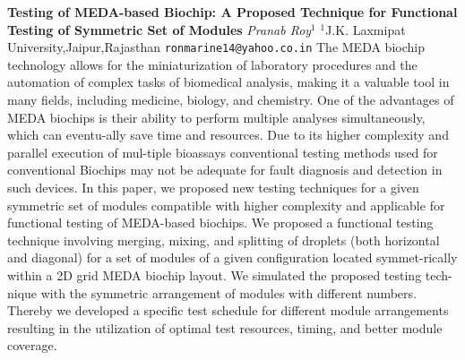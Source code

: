 
    \begin{conf-abstract}[]
        {\textbf{Testing of MEDA-based Biochip: A Proposed Technique for Functional Testing of Symmetric Set of Modules}}
        {\textit{Pranab Roy$^{1}$}}
        {$^{1}$J.K. Laxmipat University,Jaipur,Rajasthan}
        {\texttt{ronmarine14@yahoo.co.in}}
        {The MEDA biochip technology allows for the miniaturization of laboratory procedures and the automation of complex tasks of biomedical analysis, making it a valuable tool in many fields, including medicine, biology, and chemistry. One of the advantages of MEDA biochips is their ability to perform multiple analyses simultaneously, which can eventu-ally save time and resources. Due to its higher complexity and parallel execution of mul-tiple bioassays conventional testing methods used for conventional Biochips may not be adequate for fault diagnosis and detection in such devices. In this paper, we proposed new testing techniques for a given symmetric set of modules compatible with higher complexity and applicable for functional testing of MEDA-based biochips. We proposed a functional testing technique involving merging, mixing, and splitting of droplets (both horizontal and diagonal) for a set of modules of a given configuration located symmet-rically within a 2D grid MEDA biochip layout. We simulated the proposed testing tech-nique with the symmetric arrangement of modules with different numbers. Thereby we developed a specific test schedule for different module arrangements resulting in the utilization of optimal test resources, timing, and better module coverage.}
    \end{conf-abstract}
        